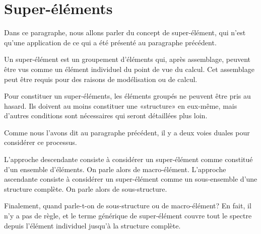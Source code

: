 \medskip
\section{Super-éléments}

Dans ce paragraphe, nous allons parler du concept de super-élément, qui n'est qu'une
application de ce qui a été présenté au paragraphe précédent.

\medskip
Un super-élément est un groupement d'éléments qui, après
assemblage, peuvent être vus comme un élément individuel du point de vue du calcul.
Cet assemblage peut être requis pour des raisons de modélisation ou de calcul.

Pour constituer un super-éléments, les éléments groupés ne peuvent être
pris au hasard. Ils doivent au moins constituer une «structure» en eux-même, mais
d'autres conditions sont nécessaires qui seront détaillées plus loin.

Comme nous l'avons dit au paragraphe précédent, il y a deux voies duales pour considérer
ce processus.

L'approche descendante consiste à considérer un super-élément comme constitué
d'un ensemble d'éléments. On parle alors de macro-élément.
L'approche ascendante consiste à considérer un super-élément comme un sous-ensemble
d'une structure complète. On parle alors de sous-structure.

Finalement, quand parle-t-on de sous-structure ou de macro-élément?
En fait, il n'y a pas de règle, et le terme générique de super-élément couvre tout le
spectre depuis l'élément individuel jusqu'à la structure complète.


